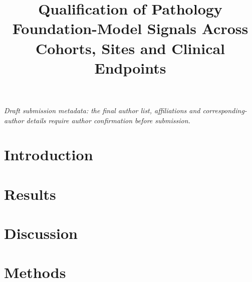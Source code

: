 \documentclass[11pt,a4paper]{article}
\title{Qualification of Pathology Foundation-Model Signals Across Cohorts, Sites and Clinical Endpoints}
\date{}
\begin{document}
\maketitle
\begin{center}
\small\textit{Draft submission metadata: the final author list, affiliations and
corresponding-author details require author confirmation before submission.}
\end{center}



\section{Introduction}


\section{Results}


\section{Discussion}


\section{Methods}





\end{document}
